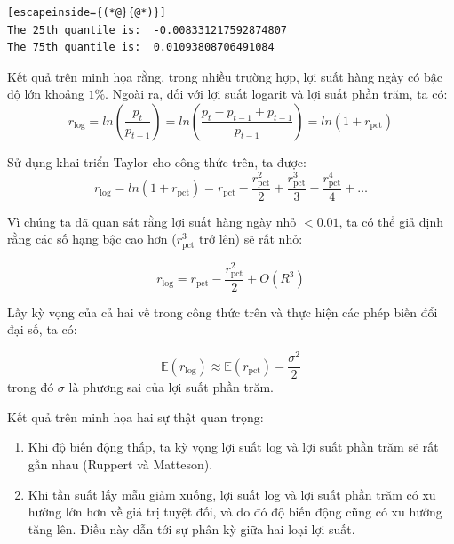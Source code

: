 \begin{lstlisting}[escapeinside={(*@}{@*)}]
The 25th quantile is:  -0.008331217592874807
The 75th quantile is:  0.01093808706491084
\end{lstlisting}

Kết quả trên minh họa rằng, trong nhiều trường hợp, lợi suất hàng ngày có bậc độ lớn khoảng $1\%$. Ngoài ra, đối với lợi suất logarit và lợi suất phần trăm, ta có:
$$
r_{\text{log}} = ln \left ( \frac{p_{t}}{p_{t-1}} \right ) =
ln \left ( \frac{p_{t} - p_{t-1} + p_{t-1}}{p_{t-1}} \right ) =
ln (1 + r_{\text{pct}})
$$

Sử dụng khai triển Taylor cho công thức trên, ta được:
$$
r_{\text{log}} = ln (1 + r_{\text{pct}}) = r_{\text{pct}} - \frac{r_{\text{pct}}^2}{2} + \frac{r_{\text{pct}}^3}{3} - \frac{r_{\text{pct}}^4}{4} + \dots
$$

Vì chúng ta đã quan sát rằng lợi suất hàng ngày nhỏ $< 0.01$, ta có thể giả định rằng các số hạng bậc cao hơn ($r_{\text{pct}}^3$ trở lên) sẽ rất nhỏ:

$$
r_{\text{log}} = r_{\text{pct}} - \frac{r_{\text{pct}}^2}{2} + O(R^3)
$$

Lấy kỳ vọng của cả hai vế trong công thức trên và thực hiện các phép biến đổi đại số, ta có:

$$
\mathbb{E}(r_{\text{log}}) \approx \mathbb{E}(r_{\text{pct}}) - \frac{\sigma^2}{2}
$$
trong đó $\sigma$ là phương sai của lợi suất phần trăm.

Kết quả trên minh họa hai sự thật quan trọng:
\begin{enumerate}
  \item Khi độ biến động thấp, ta kỳ vọng lợi suất log và lợi suất phần trăm sẽ rất gần nhau (Ruppert và Matteson).
  \item Khi tần suất lấy mẫu giảm xuống, lợi suất log và lợi suất phần trăm có xu hướng lớn hơn về giá trị tuyệt đối, và do đó độ biến động cũng có xu hướng tăng lên. Điều này dẫn tới sự phân kỳ giữa hai loại lợi suất.
\end{enumerate}

